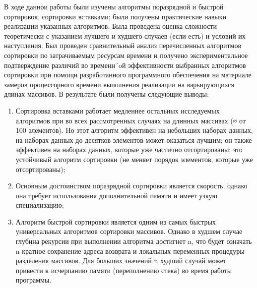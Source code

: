 \Conclusion %
В ходе даннои работы были изучены алгоритмы поразрядной и быстрой сортировок, сортировки
вставками; были получены практические навыки реализации указанных алгоритмов. Была проведена
оценка сложности теоретически с указанием лучшего и худшего случаев (если есть) и условий их наступления. Был проведен сравнительный анализ перечисленных алгоритмов сортировки по затрачиваемым
ресурсам времени и получено экспериментальное подтверждение различий во временн´oй эффективности
выбранных алгоритмов сортировки при помощи разработанного программного обеспечения на материале
замеров процессорного времени выполнения реализации на варьирующихся длинах массивов. В результате были получены следующие выводы:
\begin{enumerate}

	\item Сортировка вставками работает медленнее остальных исследуемых алгоритмов при во всех рассмотренных случаях на длинных массивах (≈ от 100 элементов). Но этот алгоритм эффективен на
небольших наборах данных, на наборах данных до десятков элементов может оказаться лучшим;
он также эффективен на наборах данных, которые уже частично отсортированы; это устойчивый
алгоритм сортировки (не меняет порядок элементов, которые уже отсортированы);
	\item Основным достоинством поразрядной сортировки является скорость, однако она требует использования дополнительной памяти и имеет узкую специализацию;
	\item	Алгоритм быстрой сортировки является одним из самых быстрых универсальных алгоритмов сортировки массивов. Однако в худшем случае глубина рекурсии при выполнении алгоритма достигнет n,
что будет означать n-кратное сохранение адреса возврата и локальных переменных процедуры разделения массивов. Для больших значений n худший случай может привести к исчерпанию памяти
(переполнению стека) во время работы программы.
\end{enumerate}
